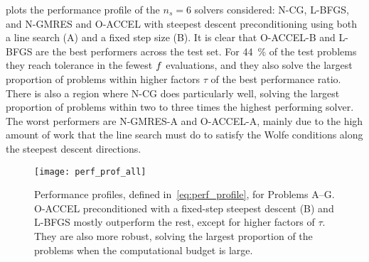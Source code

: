 \documentclass[main.tex]{subfiles}
\begin{document}
 plots the performance profile of the $n_s=6$
solvers considered: N-CG, L-BFGS, and N-GMRES and O-ACCEL with
steepest descent preconditioning using both a line search (A) and a
fixed step size (B).  It is clear that O-ACCEL-B and L-BFGS are the
best performers across the test set.  For \SI{44}{\percent} of the
test problems they reach tolerance in the fewest $f$ evaluations,
and they also solve the largest proportion of problems within higher
factors $\tau$ of the best performance ratio.  There is also a region
where N-CG does particularly well, solving the largest proportion of
problems within two to three times the highest performing solver.  The
worst performers are N-GMRES-A and O-ACCEL-A, mainly due to the high
amount of work that the line search must do to satisfy the Wolfe
conditions along the steepest descent directions.
\begin{figure}[htb]
  \centering
  \texttt{[image: perf\_prof\_all]}
  \caption{Performance profiles, defined in~\eqref{eq:perf_profile},
    for Problems A--G.
    O-ACCEL preconditioned with a fixed-step steepest descent (B) and
    L-BFGS mostly
    outperform the rest, except for higher factors of $\tau$. They are
    also more robust, solving the largest proportion
    of the problems when the computational budget is large.
  }\label{fig:perf_prof_all}
\end{figure}
\end{document}
